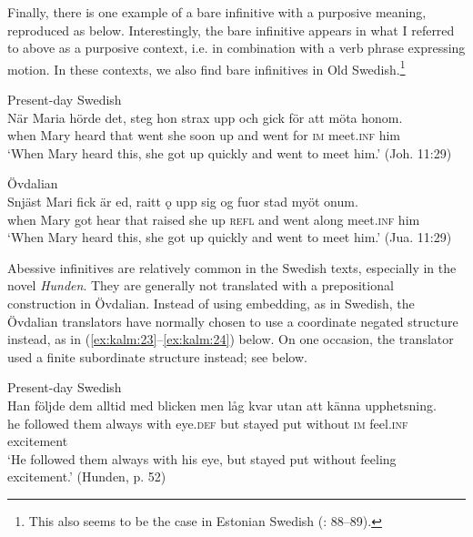 \documentclass[output=paper]{langscibook}
\begin{document}
Finally, there is one example of a bare infinitive with a purposive meaning, reproduced as  below. Interestingly, the bare infinitive appears in what I referred to above as a purposive context, i.e. in combination with a verb phrase expressing motion. In these contexts, we also find bare infinitives in Old Swedish.\footnote{This also seems to be the case in Estonian Swedish (\citealt{Lagman1958}: 88–89).} 


\ea
\label{ex:kalm:22}
\ea Present-day Swedish\label{ex:kalm:22a}\\
\gll När Maria hörde det, steg hon strax upp och gick för att möta honom.\\
when Mary heard that went she soon up and went for \textsc{im} meet.\textsc{inf} him\\
\glt ‘When Mary heard this, she got up quickly and went to meet him.’ (Joh. 11:29)

\ex Övdalian\label{ex:kalm:22b}\\ 
\gll Snjäst Mari fick är ed, raitt ǫ upp sig og fuor stad myöt onum.\\
when Mary got hear that raised she up \textsc{refl} and went along meet.\textsc{inf} him\\
\glt ‘When Mary heard this, she got up quickly and went to meet him.’ (Jua. 11:29)
\z 
\z 


Abessive infinitives are relatively common in the Swedish texts, especially in the novel \textit{Hunden}. They are generally not translated with a prepositional construction in Övdalian. Instead of using embedding, as in Swedish, the Övdalian translators have normally chosen to use a coordinate negated structure instead, as in (\ref{ex:kalm:23}--\ref{ex:kalm:24}) below. On one occasion, the translator used a finite subordinate structure instead; see  below.


\ea
\label{ex:kalm:23}
\ea Present-day Swedish\label{ex:kalm:23a}\\
\gll Han följde dem alltid med blicken men låg kvar utan att känna upphetsning.\\
he followed them always with eye.\textsc{def} but stayed put without \textsc{im} feel.\textsc{inf} excitement\\
\glt ‘He followed them always with his eye, but stayed put without feeling excitement.’ (Hunden, p. 52)\\
\end{document}
